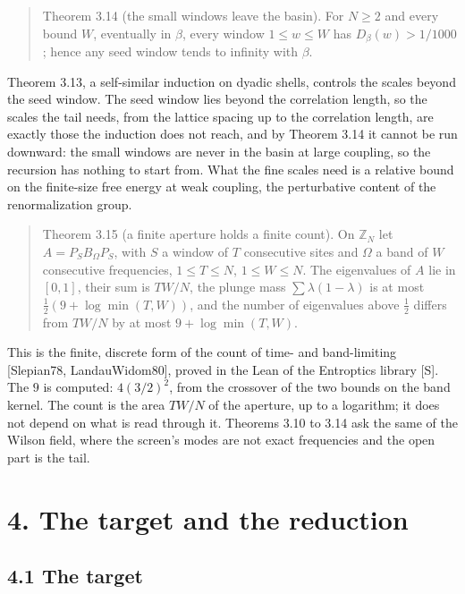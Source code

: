 \documentclass[10pt,letterpaper,twocolumn]{article}
\begin{document}
\begin{quote}
Theorem 3.14 (the small windows leave the basin). For \(N\ge2\) and every bound \(W\), eventually in \(\beta\), every window \(1\le w\le W\) has \(D_\beta(w)>1/1000\); hence any seed window tends to infinity with \(\beta\).
\end{quote}

Theorem 3.13, a self-similar induction on dyadic shells, controls the scales beyond the seed window. The seed window lies beyond the correlation length, so the scales the tail needs, from the lattice spacing up to the correlation length, are exactly those the induction does not reach, and by Theorem 3.14 it cannot be run downward: the small windows are never in the basin at large coupling, so the recursion has nothing to start from. What the fine scales need is a relative bound on the finite-size free energy at weak coupling, the perturbative content of the renormalization group.

\begin{quote}
Theorem 3.15 (a finite aperture holds a finite count). On \(\mathbb Z_N\) let \(A=P_SB_\Omega P_S\), with \(S\) a window of \(T\) consecutive sites and \(\Omega\) a band of \(W\) consecutive frequencies, \(1\le T\le N\), \(1\le W\le N\). The eigenvalues of \(A\) lie in \([0,1]\), their sum is \(TW/N\), the plunge mass \(\sum\lambda(1-\lambda)\) is at most \(\tfrac12(9+\log\min(T,W))\), and the number of eigenvalues above \(\tfrac12\) differs from \(TW/N\) by at most \(9+\log\min(T,W)\).
\end{quote}

This is the finite, discrete form of the count of time- and band-limiting {[}Slepian78, LandauWidom80{]}, proved in the Lean of the Entroptics library {[}S{]}. The \(9\) is computed: \(4(3/2)^2\), from the crossover of the two bounds on the band kernel. The count is the area \(TW/N\) of the aperture, up to a logarithm; it does not depend on what is read through it. Theorems 3.10 to 3.14 ask the same of the Wilson field, where the screen's modes are not exact frequencies and the open part is the tail.

\section{4. The target and the reduction}\label{4-the-target-and-the-reduction}

\subsection{4.1 The target}\label{41-the-target}
\end{document}
